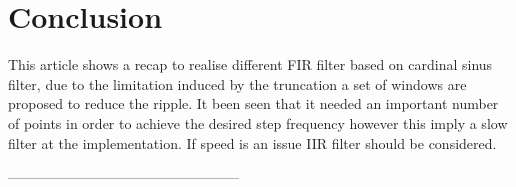 \documentclass[twoside,twocolumn]{article}
\begin{document}
\section{Conclusion}
This article shows a recap to realise different FIR filter based on cardinal sinus filter, due to the limitation induced by the truncation a set of windows are proposed to reduce the ripple. It been seen that it needed an important number of points in order to achieve the desired step frequency however this imply a slow filter at the implementation. If speed is an issue IIR filter should be considered.
\begin{thebibliography}{99} %


 
\end{thebibliography}--------------------------------------------------



\end{document}
